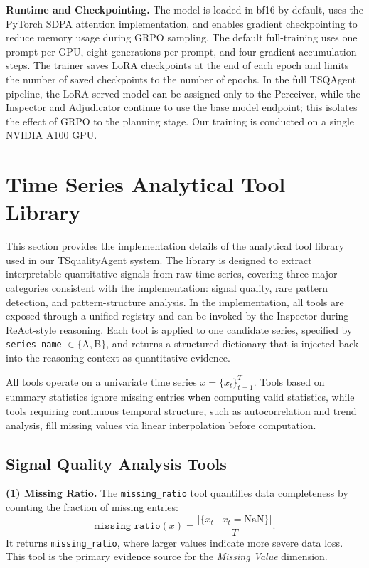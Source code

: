 \documentclass{article}
\begin{document}
\textbf{Runtime and Checkpointing.} The model is loaded in bf16 by default, uses the PyTorch SDPA attention implementation, and enables gradient checkpointing to reduce memory usage during GRPO sampling. The default full-training uses one prompt per GPU, eight generations per prompt, and four gradient-accumulation steps. The trainer saves LoRA checkpoints at the end of each epoch and limits the number of saved checkpoints to the number of epochs. In the full TSQAgent pipeline, the LoRA-served model can be assigned only to the Perceiver, while the Inspector and Adjudicator continue to use the base model endpoint; this isolates the effect of GRPO to the planning stage. Our training is conducted on a single NVIDIA A100 GPU.



\section{Time Series Analytical Tool Library}
\label{app:tools}

This section provides the implementation details of the analytical tool library used in our TSqualityAgent system. The library is designed to extract interpretable quantitative signals from raw time series, covering three major categories consistent with the implementation: signal quality, rare pattern detection, and pattern-structure analysis. In the implementation, all tools are exposed through a unified registry and can be invoked by the Inspector during ReAct-style reasoning. Each tool is applied to one candidate series, specified by \texttt{series\_name} $\in \{\mathrm{A}, \mathrm{B}\}$, and returns a structured dictionary that is injected back into the reasoning context as quantitative evidence.

All tools operate on a univariate time series $x = \{x_t\}_{t=1}^T$. Tools based on summary statistics ignore missing entries when computing valid statistics, while tools requiring continuous temporal structure, such as autocorrelation and trend analysis, fill missing values via linear interpolation before computation.

\subsection{Signal Quality Analysis Tools}

\textbf{(1) Missing Ratio.}
The \texttt{missing\_ratio} tool quantifies data completeness by counting the fraction of missing entries:
\begin{equation}
\texttt{missing\_ratio}(x) = \frac{|\{x_t \mid x_t = \text{NaN}\}|}{T}.
\end{equation}
It returns \texttt{missing\_ratio}, where larger values indicate more severe data loss. This tool is the primary evidence source for the \textit{Missing Value} dimension.
\end{document}
